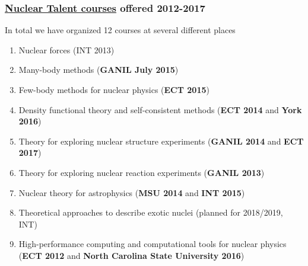 \documentclass{beamer}
\begin{document}
\begin{frame}
\frametitle{\href{{http://fribtheoryalliance.org/TALENT/courses/courses.php}}{Nuclear Talent courses}  offered 2012-2017}

\begin{block}{}
In total we have organized 12 courses at several different places
\begin{enumerate}
\item Nuclear forces (INT 2013)

\item Many-body methods (\textbf{GANIL July 2015})

\item Few-body methods for nuclear physics (\textbf{ECT 2015})

\item Density functional theory and self-consistent methods (\textbf{ECT 2014} and \textbf{York 2016})

\item Theory for exploring nuclear structure experiments (\textbf{GANIL 2014} and \textbf{ECT 2017})

\item Theory for exploring nuclear reaction experiments (\textbf{GANIL 2013})

\item Nuclear theory for astrophysics (\textbf{MSU 2014} and \textbf{INT 2015})

\item Theoretical approaches to describe  exotic nuclei (planned for 2018/2019, INT)

\item High-performance computing and computational tools for nuclear physics (\textbf{ECT 2012} and \textbf{North Carolina State University 2016})
\end{enumerate}

\noindent
\end{block}
\end{frame}
\end{document}
